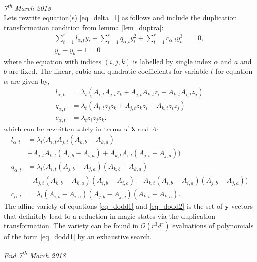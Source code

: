 \documentclass[11pt,a4paper]{article}
\begin{document}
	\noindent \textit{7\textsuperscript{th} March 2018}\\
	Lets rewrite equation(s) \eqref{eq_delta_1} as follows and include the duplication transformation condition from lemma \eqref{lem_duptra}:
	\begin{align}
	\label{eq_dodd1}
	\sum_{t=1}^{r}l_{\alpha,t}y_t + \sum_{t=1}^{r}q_{\alpha,t}y_t^2 + \sum_{t=1}^{r}c_{\alpha,t}y_t^3 &= 0, \\
	\label{eq_dodd2} y_a - y_b - 1 = 0
	\end{align}
	where the equation with indices $(i,j,k)$ is labelled by single index $\alpha$ and $a$ and $b$ are fixed. The linear, cubic and quadratic coefficients for variable $t$ for equation $\alpha$ are given by,
	\begin{align}
	l_{\alpha,t} &= \lambda_t (A_{i,t} A_{j,t} z_k + A_{j,t} A_{k,t} z_i + A_{k,t} A_{i,t} z_j) \\
	q_{\alpha,t} &= \lambda_t (A_{i,t} z_j z_k + A_{j,t} z_k z_i + A_{k,t} z_i z_j)\\
	c_{\alpha,t} &= \lambda_t z_i z_j z_k.
	\end{align}
	which can be rewritten solely in terms of $\mathbf{\lambda}$ and $A$:
	\begin{equation}
	\begin{split}
	l_{\alpha,t} &= \lambda_t (A_{i,t} A_{j,t} (A_{k,b}-A_{k,a})\\ &+ A_{j,t} A_{k,t}  (A_{i,b}-A_{i,a}) + A_{k,t} A_{i,t}  (A_{j,b}-A_{j,a})) \\
	q_{\alpha,t} &= \lambda_t (A_{i,t} (A_{j,b}-A_{j,a})(A_{k,b}-A_{k,a}) \\&+ A_{j,t}(A_{k,b}-A_{k,a}) (A_{i,b}-A_{i,a}) + A_{k,t} (A_{i,b}-A_{i,a}) (A_{j,b}-A_{j,a}))\\
	c_{\alpha,t} &= \lambda_t (A_{i,b}-A_{i,a}) (A_{j,b}-A_{j,a}) (A_{k,b}-A_{k,a}).
	\end{split}
	\end{equation}	
	The affine variety of equations \eqref{eq_dodd1} and \eqref{eq_dodd2} is the set of $\mathbf{y}$ vectors that definitely lead to a reduction in magic states via the duplication transformation. The variety can be found in $\mathcal{O}(r^3d^r)$ evaluations of polynomials of the form  \eqref{eq_dodd1} by an exhaustive search. 
	
	\noindent \textit{End 7\textsuperscript{th} March 2018}\\
	
\end{document}
